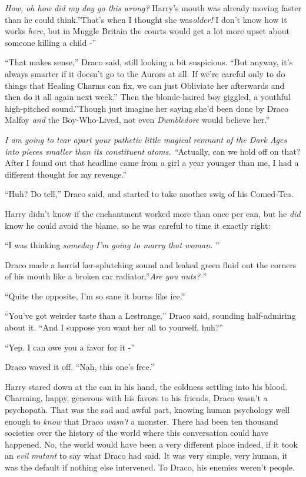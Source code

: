 \emph{How, oh how did my day go this wrong?} Harry's mouth was already
moving faster than he could think.''That's when I thought she
was\emph{older!} I don't know how it works \emph{here}, but in Muggle
Britain the courts would get a lot more upset about someone killing a
child -''

``That makes sense,'' Draco said, still looking a bit suspicious. ``But
anyway, it's always smarter if it doesn't go to the Aurors at all. If
we're careful only to do things that Healing Charms can fix, we can just
Obliviate her afterwards and then do it all again next week.'' Then the
blonde-haired boy giggled, a youthful high-pitched sound.''Though just
imagine her saying she'd been done by Draco Malfoy \emph{and} the
Boy-Who-Lived, not even \emph{Dumbledore} would believe her.''

\emph{I am going to tear apart your pathetic little magical remnant of
the Dark Ages into pieces smaller than its constituent atoms.
``}Actually, can we hold off on that? After I found out that headline
came from a girl a year younger than me, I had a different thought for
my revenge.''

``Huh? Do tell,'' Draco said, and started to take another swig of his
Comed-Tea.

Harry didn't know if the enchantment worked more than once per can, but
he \emph{did} know he could avoid the blame, so he was careful to time
it exactly right:

``I was thinking \emph{someday I'm going to marry that woman.} ''

Draco made a horrid ker-splutching sound and leaked green fluid out the
corners of his mouth like a broken car radiator.''\emph{Are you nuts?} ''

``Quite the opposite, I'm so sane it burns like ice.''

``You've got weirder taste than a Lestrange,'' Draco said, sounding
half-admiring about it. ``And I suppose you want her all to yourself,
huh?''

``Yep. I can owe you a favor for it -''

Draco waved it off. ``Nah, this one's free.''

Harry stared down at the can in his hand, the coldness settling into his
blood. Charming, happy, generous with his favors to his friends, Draco
wasn't a psychopath. That was the sad and awful part, knowing human
psychology well enough to \emph{know} that Draco \emph{wasn't} a
monster. There had been ten thousand societies over the history of the
world where this conversation could have happened. No, the world would
have been a very different place indeed, if it took an \emph{evil}
\emph{mutant} to say what Draco had said. It was very simple, very
human, it was the default if nothing else intervened. To Draco, his
enemies weren't people.

